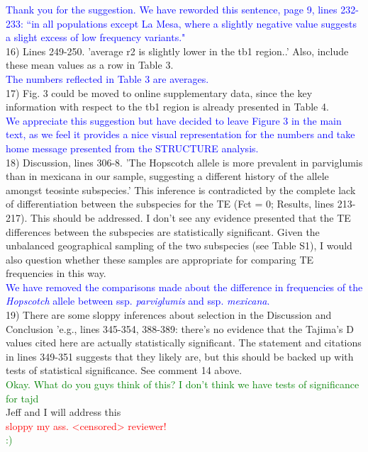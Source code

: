 \documentclass[11pt]{article}
\newcommand{\res}[1]{\noindent \textcolor{blue}{{#1}} \\}
\newcommand{\jri}[1]{\noindent \textcolor{red}{{#1}} \\}
\newcommand{\lev}[1]{\noindent \textcolor{green}{{#1}} \\}
\newcommand{\mbh}[1]{\noindent \textcolor{Dandelion}{{#1}}\\}
\begin{document}
\res{Thank you for the suggestion. We have reworded this sentence, page 9, lines 232-233: ``in all populations except La Mesa, where a slightly negative value suggests a slight excess of low frequency variants."}

16) Lines 249-250. 'average r2 is slightly lower in the tb1 region..' Also, include these mean values as a row in Table 3.\\

\res{The numbers reflected in Table 3 are averages.}

17) Fig. 3 could be moved to online supplementary data, since the key information with respect to the tb1 region is already presented in Table 4. \\

\res{We appreciate this suggestion but have decided to leave Figure 3 in the main text, as we feel it provides a nice visual representation for the numbers and take home message presented from the STRUCTURE analysis.}

18) Discussion, lines 306-8. 'The Hopscotch allele is more prevalent in parviglumis than in mexicana in our sample, suggesting a different history of the allele amongst teosinte subspecies.' This inference is contradicted by the complete lack of differentiation between the subspecies for the TE (Fct = 0; Results, lines 213-217). This should be addressed. I don't see any evidence presented that the TE differences between the subspecies are statistically significant. Given the unbalanced geographical sampling of the two subspecies (see Table S1), I would also question whether these samples are appropriate for comparing TE frequencies in this way. \\

\res{We have removed the comparisons made about the difference in frequencies of the \emph{Hopscotch} allele between ssp. \emph{parviglumis} and ssp. \emph{mexicana}.}

19) There are some sloppy inferences about selection in the Discussion and Conclusion 'e.g., lines 345-354, 388-389: there's no evidence that the Tajima's D values cited here are actually statistically significant. The statement and citations in lines 349-351 suggests that they likely are, but this should be backed up with tests of statistical significance. See comment 14 above.\\

\lev{Okay. What do you guys think of this? I don't think we have tests of significance for tajd}

\mbh{Jeff and I will address this}
\jri{sloppy my ass. <censored> reviewer!}
\lev{ :) }
\end{document}
